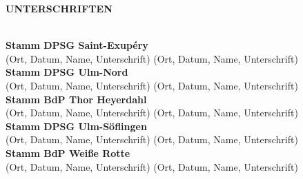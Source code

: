 \begin{Large}
    \textbf{UNTERSCHRIFTEN}
\end{Large}
\\

\textbf{Stamm DPSG Saint-Exupéry}
\\
(Ort, Datum, Name, Unterschrift) (Ort, Datum, Name, Unterschrift)
\\

\textbf{Stamm DPSG Ulm-Nord}
\\
(Ort, Datum, Name, Unterschrift) (Ort, Datum, Name, Unterschrift)
\\

\textbf{Stamm BdP Thor Heyerdahl}
\\
(Ort, Datum, Name, Unterschrift) (Ort, Datum, Name, Unterschrift)
\\

\textbf{Stamm DPSG Ulm-Söflingen}
\\
(Ort, Datum, Name, Unterschrift) (Ort, Datum, Name, Unterschrift)
\\

\textbf{Stamm BdP Weiße Rotte}
\\
(Ort, Datum, Name, Unterschrift) (Ort, Datum, Name, Unterschrift)
